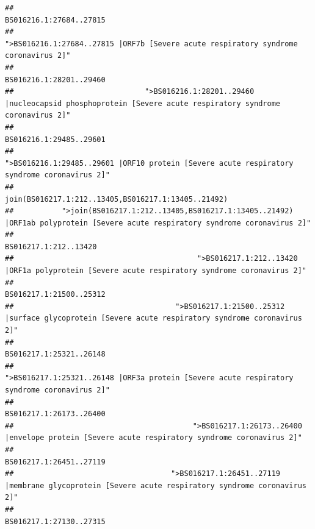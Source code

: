 \documentclass[
]{article}
\begin{document}
\begin{verbatim}
##                                                                                                                BS016216.1:27684..27815 
##                                                    ">BS016216.1:27684..27815 |ORF7b [Severe acute respiratory syndrome coronavirus 2]" 
##                                                                                                                BS016216.1:28201..29460 
##                              ">BS016216.1:28201..29460 |nucleocapsid phosphoprotein [Severe acute respiratory syndrome coronavirus 2]" 
##                                                                                                                BS016216.1:29485..29601 
##                                            ">BS016216.1:29485..29601 |ORF10 protein [Severe acute respiratory syndrome coronavirus 2]" 
##                                                                                    join(BS016217.1:212..13405,BS016217.1:13405..21492) 
##           ">join(BS016217.1:212..13405,BS016217.1:13405..21492) |ORF1ab polyprotein [Severe acute respiratory syndrome coronavirus 2]" 
##                                                                                                                  BS016217.1:212..13420 
##                                          ">BS016217.1:212..13420 |ORF1a polyprotein [Severe acute respiratory syndrome coronavirus 2]" 
##                                                                                                                BS016217.1:21500..25312 
##                                     ">BS016217.1:21500..25312 |surface glycoprotein [Severe acute respiratory syndrome coronavirus 2]" 
##                                                                                                                BS016217.1:25321..26148 
##                                            ">BS016217.1:25321..26148 |ORF3a protein [Severe acute respiratory syndrome coronavirus 2]" 
##                                                                                                                BS016217.1:26173..26400 
##                                         ">BS016217.1:26173..26400 |envelope protein [Severe acute respiratory syndrome coronavirus 2]" 
##                                                                                                                BS016217.1:26451..27119 
##                                    ">BS016217.1:26451..27119 |membrane glycoprotein [Severe acute respiratory syndrome coronavirus 2]" 
##                                                                                                                BS016217.1:27130..27315 

\end{verbatim}
\end{document}
